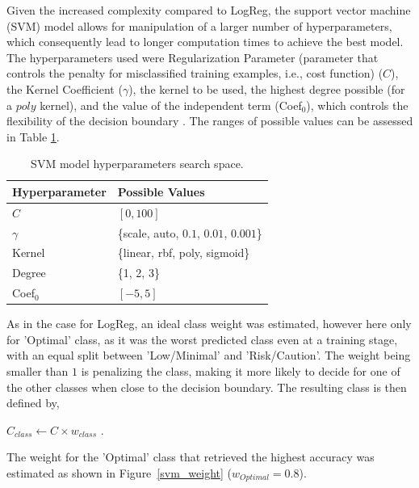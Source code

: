 \documentclass[conference]{IEEEtran}
\begin{document}
Given the increased complexity compared to LogReg, the support vector machine (SVM) model allows for manipulation of a larger number of hyperparameters, which consequently lead to longer computation times to achieve the best model. The hyperparameters used were Regularization Parameter (parameter that controls the penalty for misclassified training examples, i.e., cost function) ($C$), the Kernel Coefficient ($\gamma$), the kernel to be used, the highest degree possible (for a $poly$ kernel), and the value of the independent term (Coef$_0$), which controls the flexibility of the decision boundary \cite{svm24}. The ranges of possible values can be assessed in Table \ref{parametrosSVM}.

\begin{table}[H]
\centering
\caption{SVM model hyperparameters search space.}
\label{parametrosSVM}
\begin{tabular}{ll}
\toprule
\textbf{Hyperparameter} & \textbf{Possible Values} \\
\midrule
$C$ & $[0, 100]$ \\ 
$\gamma$ & \{scale, auto, $0.1$, $0.01$, $0.001$\} \\ 
Kernel & \{linear, rbf, poly, sigmoid\} \\ 
Degree & \{1, 2, 3\} \\ 
Coef$_0$ & $[-5, 5]$ \\
\bottomrule
\end{tabular}
\end{table} %

As in the case for LogReg, an ideal class weight was estimated, however here only for 'Optimal' class, as it was the worst predicted class even at a training stage, with an equal split between 'Low/Minimal' and 'Risk/Caution'. The weight being smaller than $1$ is penalizing the class, making it more likely to decide for one of the other classes when close to the decision boundary. The resulting class is then defined by,

$C_{class} \leftarrow C \times w_{class}$ \cite{svm24}.

The weight for the 'Optimal' class that retrieved the highest accuracy was estimated as shown in Figure~\ref{svm_weight} ($w_{Optimal}=0.8$). 
\end{document}
